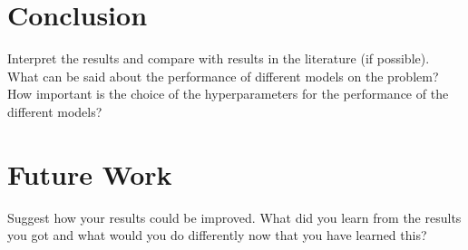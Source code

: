 \documentclass[11pt]{article}
\begin{document}
\section{Conclusion}
Interpret the results and compare with results in the literature (if possible). What can be said about the performance of different models on the problem? 
How important is the choice of the hyperparameters for the performance of the different models?

\section{Future Work}
Suggest how your results could be improved. What did you learn from the results you got and what would you do differently now that you have learned this?
\end{document}
